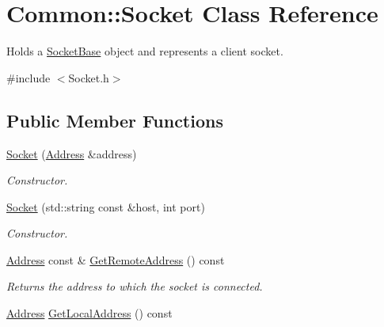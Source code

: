 \hypertarget{class_common_1_1_socket}{\section{Common\-:\-:Socket Class Reference}
\label{class_common_1_1_socket}
}


Holds a \hyperlink{class_common_1_1_socket_base}{Socket\-Base} object and represents a client socket.  




{\ttfamily \#include $<$Socket.\-h$>$}

\subsection*{Public Member Functions}
\begin{DoxyCompactItemize}
\item 
\hyperlink{class_common_1_1_socket_a6f6df7a236cb18956a38d3e2a1e4e9cf}{Socket} (\hyperlink{class_common_1_1_address}{Address} \&address)
\begin{DoxyCompactList}\small\item\em Constructor. \end{DoxyCompactList}\item 
\hyperlink{class_common_1_1_socket_abf5f187e36e9699ff367e9754b7d5f55}{Socket} (std\-::string const \&host, int port)
\begin{DoxyCompactList}\small\item\em Constructor. \end{DoxyCompactList}\item 
\hypertarget{class_common_1_1_socket_a13a9242169ad98425e441c35b2d95f7f}{\hyperlink{class_common_1_1_address}{Address} const \& \hyperlink{class_common_1_1_socket_a13a9242169ad98425e441c35b2d95f7f}{Get\-Remote\-Address} () const }\label{class_common_1_1_socket_a13a9242169ad98425e441c35b2d95f7f}

\begin{DoxyCompactList}\small\item\em Returns the address to which the socket is connected. \end{DoxyCompactList}\item 
\hypertarget{class_common_1_1_socket_aa01cbe76f1a090f3e0ba1f1ebbfba9af}{\hyperlink{class_common_1_1_address}{Address} \hyperlink{class_common_1_1_socket_aa01cbe76f1a090f3e0ba1f1ebbfba9af}{Get\-Local\-Address} () const }\label{class_common_1_1_socket_aa01cbe76f1a090f3e0ba1f1ebbfba9af}


\end{DoxyCompactItemize}
